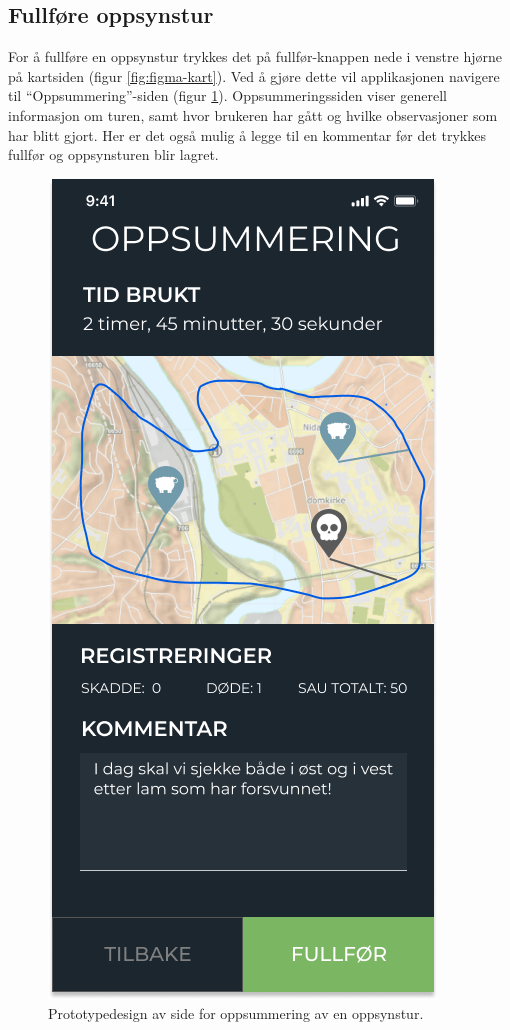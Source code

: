\subsection{Fullføre oppsynstur}
For å fullføre en oppsynstur trykkes det på fullfør-knappen nede i venstre hjørne på kartsiden (figur \ref{fig:figma-kart}). Ved å gjøre dette vil applikasjonen navigere til \enquote{Oppsummering}-siden (figur \ref{fig:figma-oppsummering}). Oppsummeringssiden viser generell informasjon om turen, samt hvor brukeren har gått og hvilke observasjoner som har blitt gjort. Her er det også mulig å legge til en kommentar før det trykkes fullfør og oppsynsturen blir lagret.
\begin{figure}[H]
\centering
\captionsetup{width=.8\linewidth}
\includegraphics[scale=0.4]{Figurer/Figma/Frame 2.3 - Oppsummering oppsynstur.png}
\caption{Prototypedesign av side for oppsummering av en oppsynstur.}
\label{fig:figma-oppsummering}
\end{figure}


